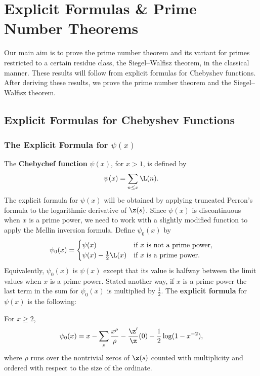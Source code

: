 \chapter{Explicit Formulas \& Prime Number Theorems}
  Our main aim is to prove the prime number theorem and its variant for primes restricted to a certain residue class, the Siegel–Walfisz theorem, in the classical manner. These results will follow from explicit formulas for Chebyshev functions. After deriving these results, we prove the prime number theorem and the Siegel–Walfisz theorem.
  \section{Explicit Formulas for Chebyshev Functions}
    \subsection*{The Explicit Formula for \texorpdfstring{$\psi(x)$}{$\psi(x)$}}
      The \textbf{Chebychef function} $\psi(x)$, for $x > 1$, is defined by
      \[
        \psi(x) = \sum_{n \le x}\L(n).
      \]
      The explicit formula for $\psi(x)$ will be obtained by applying truncated Perron's formula to the logarithmic derivative of $\z(s)$. Since $\psi(x)$ is discontinuous when $x$ is a prime power, we need to work with a slightly modified function to apply the Mellin inversion formula. Define $\psi_{0}(x)$ by
      \[
        \psi_{0}(x) = \begin{cases} \psi(x) & \text{if $x$ is not a prime power}, \\ \psi(x)-\frac{1}{2}\L(x) & \text{if $x$ is a prime power}. \end{cases}
      \]
      Equivalently, $\psi_{0}(x)$ is $\psi(x)$ except that its value is halfway between the limit values when $x$ is a prime power. Stated another way, if $x$ is a prime power the last term in the sum for $\psi_{0}(x)$ is multiplied by $\frac{1}{2}$. The \textbf{explicit formula} for $\psi(x)$ is the following:

      \begin{theorem}
        For $x \ge 2$,
        \[
          \psi_{0}(x) = x-\sum_{\rho}\frac{x^{\rho}}{\rho}-\frac{\z'}{\z}(0)-\frac{1}{2}\log(1-x^{-2}),
        \]
        where $\rho$ runs over the nontrivial zeros of $\z(s)$ counted with multiplicity and ordered with respect to the size of the ordinate.
      \end{theorem}

